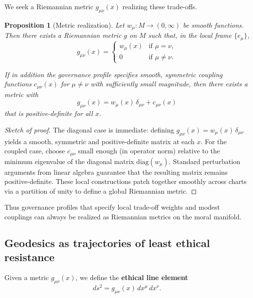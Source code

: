 \documentclass[12pt]{article}
\newtheorem{proposition}[theorem]{Proposition}
\theoremstyle{remark}
\begin{document}
We seek a Riemannian metric $g_{\mu\nu}(x)$ realizing these trade-offs.

\begin{proposition}[Metric realization]
Let $w_\mu\colon M \to (0,\infty)$ be smooth functions. Then there exists a Riemannian metric $g$ on $M$ such that, in the local frame $\{e_\mu\}$,
\begin{equation}
    g_{\mu\nu}(x) =
    \begin{cases}
        w_\mu(x) & \text{if } \mu = \nu,\\
        0         & \text{if } \mu \neq \nu.
    \end{cases}
\end{equation}

If in addition the governance profile specifies smooth, symmetric coupling functions $c_{\mu\nu}(x)$ for $\mu \neq \nu$ with sufficiently small magnitude, then there exists a metric with
\begin{equation}
    g_{\mu\nu}(x) = w_\mu(x)\, \delta_{\mu\nu} + c_{\mu\nu}(x)
\end{equation}
that is positive-definite for all $x$.
\end{proposition}

\begin{proof}[Sketch of proof]
The diagonal case is immediate: defining $g_{\mu\nu}(x) = w_\mu(x)\,\delta_{\mu\nu}$ yields a smooth, symmetric and positive-definite matrix at each $x$. For the coupled case, choose $c_{\mu\nu}$ small enough (in operator norm) relative to the minimum eigenvalue of the diagonal matrix $\mathrm{diag}(w_\mu)$. Standard perturbation arguments from linear algebra guarantee that the resulting matrix remains positive-definite. These local constructions patch together smoothly across charts via a partition of unity to define a global Riemannian metric.
\end{proof}

Thus governance profiles that specify local trade-off weights and modest couplings can always be realized as Riemannian metrics on the moral manifold.

\subsection{Geodesics as trajectories of least ethical resistance}

Given a metric $g_{\mu\nu}(x)$, we define the \textbf{ethical line element}
\begin{equation}
    ds^2 = g_{\mu\nu}(x)\, dx^\mu\, dx^\nu.
\end{equation}
\end{document}
